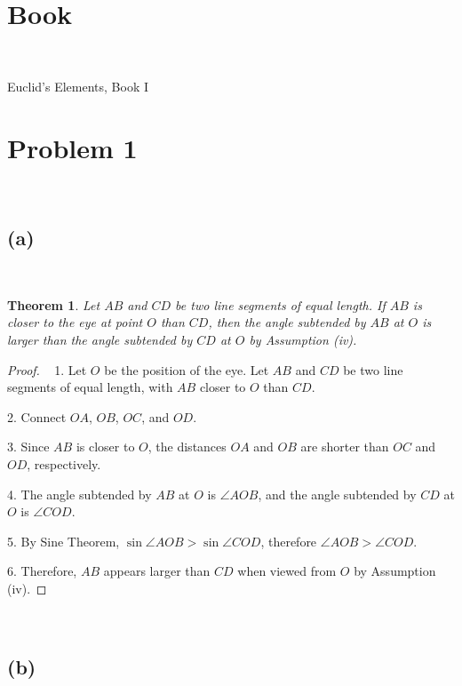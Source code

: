 \documentclass{article}
\newtheorem{theorem}{Theorem}
\begin{document}
\section*{Book}

~

Euclid's Elements, Book I

\newpage

\section*{Problem 1}

~

\subsection*{(a)}

~

\begin{theorem}
Let \( AB \) and \( CD \) be two line segments of equal length. If \( AB \) is closer to the eye at point \( O \) than \( CD \), then the angle subtended by \( AB \) at \( O \) is larger than the angle subtended by \( CD \) at \( O \) by Assumption (iv).
\end{theorem}

\begin{proof}

~
1. Let \( O \) be the position of the eye. Let \( AB \) and \( CD \) be two line segments of equal length, with \( AB \) closer to \( O \) than \( CD \).

2. Connect \( OA \), \( OB \), \( OC \), and \( OD \).

3. Since \( AB \) is closer to \( O \), the distances \( OA \) and \( OB \) are shorter than \( OC \) and \( OD \), respectively.

4. The angle subtended by \( AB \) at \( O \) is \( \angle AOB \), and the angle subtended by \( CD \) at \( O \) is \( \angle COD \).

5. By Sine Theorem, \( \sin\angle AOB >\sin\angle COD \), therefore \(\angle AOB >\angle COD\).

6. Therefore, \( AB \) appears larger than \( CD \) when viewed from \( O \) by Assumption (iv).
\end{proof}

~

\subsection*{(b)}
\end{document}
